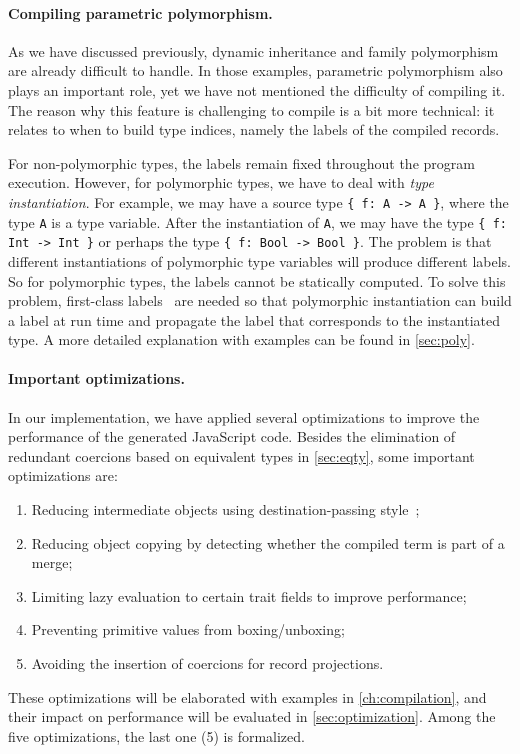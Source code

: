 \paragraph{Compiling parametric polymorphism.}
As we have discussed previously, dynamic inheritance and family polymorphism are
already difficult to handle. In those examples, parametric polymorphism also
plays an important role, yet we have not mentioned the difficulty of compiling
it. The reason why this feature is challenging to compile is a bit more
technical: it relates to when to build type indices, namely the labels of the
compiled records.

For non-polymorphic types, the labels remain fixed throughout the program
execution. However, for polymorphic types, we have to deal with \emph{type
instantiation}. For example, we may have a source type \lstinline|{ f: A -> A }|,
where the type \lstinline|A| is a type variable. After the instantiation of
\lstinline|A|, we may have the type \lstinline|{ f: Int -> Int }| or perhaps
the type \lstinline|{ f: Bool -> Bool }|. The problem is that different
instantiations of polymorphic type variables will produce different labels. So
for polymorphic types, the labels cannot be statically computed. To solve this
problem, first-class labels~\citep{leijen2004first} are needed so that
polymorphic instantiation can build a label at run time and propagate the label
that corresponds to the instantiated type. A more detailed explanation with
examples can be found in \autoref{sec:poly}.

\paragraph{Important optimizations.}
In our implementation, we have applied several optimizations to improve the
performance of the generated JavaScript code. Besides the elimination of
redundant coercions based on equivalent types in \autoref{sec:eqty}, some
important optimizations are:
\begin{enumerate}
\item Reducing intermediate objects using destination-passing
      style~\citep{shaikhha2017destination};
\item Reducing object copying by detecting whether the compiled term is part of
      a merge;
\item Limiting lazy evaluation to certain trait fields to improve performance;
\item Preventing primitive values from boxing/unboxing;
\item Avoiding the insertion of coercions for record projections.
\end{enumerate}
These optimizations will be elaborated with examples in
\autoref{ch:compilation}, and their impact on performance will be evaluated in
\autoref{sec:optimization}. Among the five optimizations, the last one (5) is
formalized.
